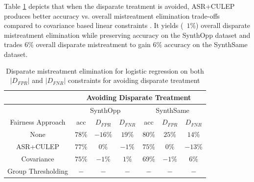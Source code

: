 \documentclass[runningheads]{llncs}
\begin{document}
Table \ref{tab:avoiddisptreatmenttable} depicts that when the disparate treatment is avoided, ASR+CULEP produces better accuracy vs. overall mistreatment elimination trade-offs compared to covariance based linear constraints \cite{krasanakis2018adaptive}. It yields (~$1\%$) overall disparate mistreatment elimination while preserving accuracy on the SynthOpp dataset and trades $6\%$ overall disparate mistreatment to gain $6\%$ accuracy on the SynthSame dataset.

\begin{table}[!htbp]
      \centering
\begin{tabular}{|c|c|c|c|c|c|c|}
\hline
{} & \multicolumn{6}{c}{Avoiding Disparate Treatment} \vline \\
\hline
{} & \multicolumn{3}{c|}{SynthOpp} & \multicolumn{3}{c|}{SynthSame} \vline \\
\hline
Fairness Approach & acc & $D_{FPR}$ & $D_{FNR}$ & acc & $D_{FPR}$ & $D_{FNR}$ \\
\hline
None & $78\%$ & $-16\%$  & $19\%$  & $80\%$  & $25\%$  & $14\%$ \\
\hline
ASR+CULEP & $77\%$ & $0\%$  & $-1\%$  & $75\%$  & $0\%$  & $-13\%$ \\
\hline
Covariance & $75\%$ & $-1\%$  & $1\%$  & $69\%$  & $-1\%$  & $6\%$ \\
\hline
Group Thresholding & $-$ & $-$  & $-$  & $-$  & $-$  & $-$ \\
\hline 
\end{tabular}
\\
\caption{Disparate mistreatment elimination for logistic regression on both $|D_{FPR}|$ and $|D_{FNR}|$ constraints for avoiding disparate treatment}
\label{tab:avoiddisptreatmenttable}
\end{table}
\end{document}
